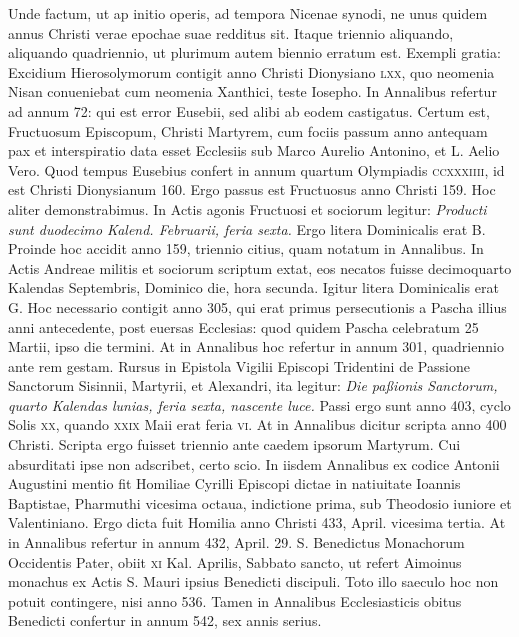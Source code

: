 Unde factum, ut ap initio operis,
ad tempora Nicenae synodi, ne unus quidem annus Christi
verae epochae suae redditus sit.
Itaque triennio aliquando, aliquando
quadriennio, ut plurimum autem biennio erratum est.
Exempli
gratia: Excidium Hierosolymorum contigit anno Christi
Dionysiano \textsc{lxx}, quo neomenia Nisan conueniebat cum neomenia
Xanthici, teste Iosepho.
In Annalibus refertur ad annum
72: qui est error Eusebii, sed alibi ab eodem castigatus.
Certum est, Fructuosum Episcopum, Christi Martyrem, cum fociis
passum anno antequam pax et interspiratio data esset Ecclesiis
sub Marco Aurelio Antonino, et L. Aelio Vero.
Quod tempus Eusebius confert in annum quartum Olympiadis
 \textsc{ccxxxiiii},
id est Christi Dionysianum 160.
Ergo passus est Fructuosus anno Christi
159.
Hoc aliter demonstrabimus.
In Actis agonis Fructuosi et
sociorum legitur: \textit{Producti sunt duodecimo Kalend. Februarii, feria
sexta.}
Ergo litera Dominicalis erat B.
Proinde hoc accidit anno
159, triennio citius, quam notatum in Annalibus.
In Actis Andreae
militis et sociorum scriptum extat, eos necatos fuisse decimoquarto
Kalendas Septembris, Dominico die, hora secunda.
Igitur litera Dominicalis erat G.
Hoc necessario contigit anno 305,
qui erat primus persecutionis a Pascha illius anni antecedente, post
euersas Ecclesias: quod quidem Pascha celebratum 25 Martii, ipso
die termini.
At in Annalibus hoc refertur in annum 301, quadriennio
ante rem gestam.
Rursus in Epistola Vigilii Episcopi Tridentini
de Passione Sanctorum Sisinnii, Martyrii, et Alexandri,
ita legitur: \textit{Die paßionis Sanctorum, quarto Kalendas lunias, feria
sexta, nascente luce.}
Passi ergo sunt anno 403, cyclo Solis \textsc{xx}, quando
\textsc{xxix} Maii erat feria \textsc{vi}.
At in Annalibus dicitur scripta
anno 400 Christi.
Scripta ergo fuisset triennio ante caedem
ipsorum Martyrum.
Cui absurditati ipse non adscribet, certo scio.
In iisdem
Annalibus ex codice Antonii Augustini mentio fit Homiliae
Cyrilli Episcopi dictae in natiuitate Ioannis Baptistae, Pharmuthi
vicesima octaua, indictione prima, sub Theodosio iuniore et Valentiniano.
Ergo dicta fuit Homilia anno Christi 433, April. vicesima
tertia.
At in Annalibus refertur in annum 432, April. 29. S. Benedictus
Monachorum Occidentis Pater, obiit \textsc{xi} Kal. Aprilis, Sabbato
sancto, ut refert Aimoinus monachus ex Actis S. Mauri ipsius
Benedicti discipuli.
Toto illo saeculo hoc non potuit contingere, nisi
anno 536.
Tamen in Annalibus Ecclesiasticis obitus Benedicti confertur
in annum 542, sex annis serius.

